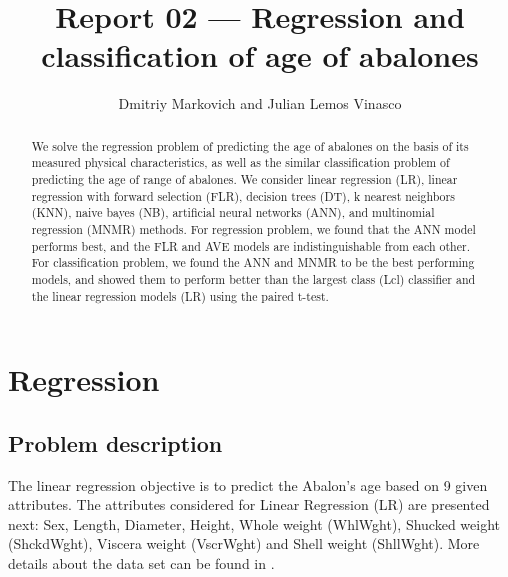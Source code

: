 \documentclass[10pt, paper=a4]{article}
\begin{document}
\title{Report 02 --- Regression and classification of age of abalones}

\author{Dmitriy Markovich and Julian Lemos Vinasco}

\date{}

\maketitle

\begin{abstract}
  We solve the regression problem of predicting the age of abalones on
  the basis of its measured physical characteristics, as well as the
  similar classification problem of predicting the age of range of
  abalones.  We consider linear regression (LR), linear regression
  with forward selection (FLR), decision trees (DT), k nearest
  neighbors (KNN), naive bayes (NB), artificial neural networks (ANN),
  and multinomial regression (MNMR) methods.  For regression problem,
  we found that the ANN model performs best, and the FLR and AVE
  models are indistinguishable from each other.  For classification
  problem, we found the ANN and MNMR to be the best performing models,
  and showed them to perform better than the largest class (Lcl)
  classifier and the linear regression models (LR) using the paired
  t-test.
\end{abstract}

\section{Regression}
\label{sec:regression}

\subsection{Problem description}
The linear regression objective is to predict the Abalon's age based
on 9 given attributes.  The attributes considered for Linear
Regression (LR) are presented next: Sex, Length, Diameter, Height,
Whole weight (WhlWght), Shucked weight (ShckdWght), Viscera weight
(VscrWght) and Shell weight (ShllWght).  More details about the data
set can be found in \cite{datadescription}.
\end{document}
